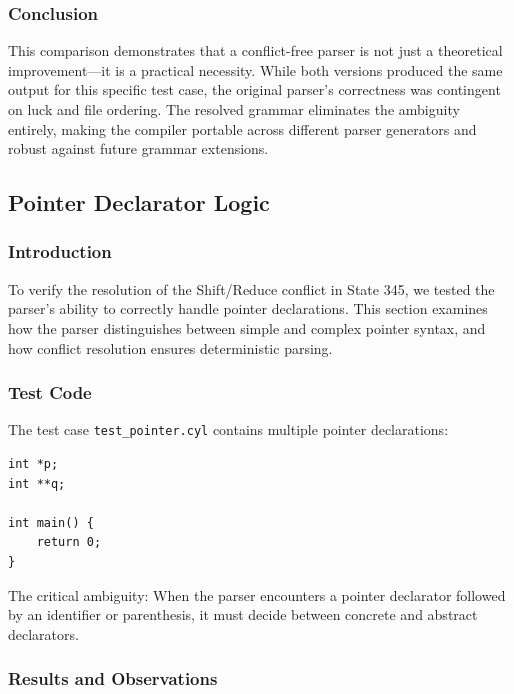 \documentclass[a4paper,12pt]{article}
\begin{document}
\subsubsection{Conclusion}

This comparison demonstrates that a conflict-free parser is not just a theoretical improvement---it is a practical necessity. While both versions produced the same output for this specific test case, the original parser's correctness was contingent on luck and file ordering. The resolved grammar eliminates the ambiguity entirely, making the compiler portable across different parser generators and robust against future grammar extensions.


\subsection{Pointer Declarator Logic}
\label{sec:pointer_declarator_analysis}

\subsubsection{Introduction}

To verify the resolution of the Shift/Reduce conflict in State 345, we tested the parser's ability to correctly handle pointer declarations. This section examines how the parser distinguishes between simple and complex pointer syntax, and how conflict resolution ensures deterministic parsing.

\subsubsection{Test Code}

The test case \texttt{test\_pointer.cyl} contains multiple pointer declarations:

\begin{lstlisting}
int *p;
int **q;

int main() {
    return 0;
}
\end{lstlisting}

The critical ambiguity: When the parser encounters a pointer declarator followed by an identifier or parenthesis, it must decide between concrete and abstract declarators.

\subsubsection{Results and Observations}
\end{document}
